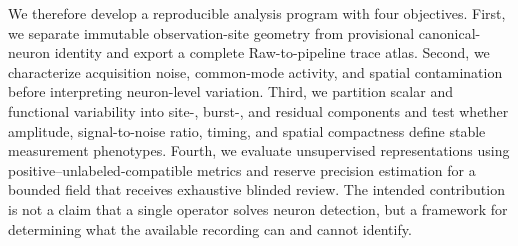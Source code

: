 We therefore develop a reproducible analysis program with four objectives. First, we separate immutable observation-site geometry from provisional canonical-neuron identity and export a complete Raw-to-pipeline trace atlas. Second, we characterize acquisition noise, common-mode activity, and spatial contamination before interpreting neuron-level variation. Third, we partition scalar and functional variability into site-, burst-, and residual components and test whether amplitude, signal-to-noise ratio, timing, and spatial compactness define stable measurement phenotypes. Fourth, we evaluate unsupervised representations using positive--unlabeled-compatible metrics and reserve precision estimation for a bounded field that receives exhaustive blinded review. The intended contribution is not a claim that a single operator solves neuron detection, but a framework for determining what the available recording can and cannot identify.
